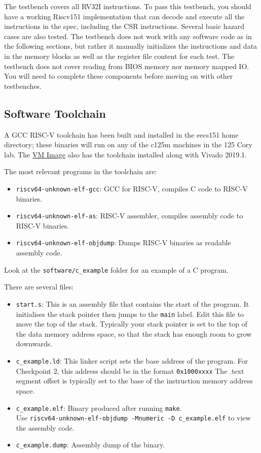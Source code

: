 \documentclass[11pt]{article}
\begin{document}
The testbench covers all RV32I instructions. To pass this testbench, you should have a working Riscv151 implementation that can decode and execute all the instructions in the spec, including the CSR instructions. Several basic hazard cases are also tested. The testbench does not work with any software code as in the following sections, but rather it manually initializes the instructions and data in the memory blocks as well as the register file content for each test. The testbench does not cover reading from BIOS memory nor memory mapped IO. You will need to complete these components before moving on with other testbenches.

\subsection{Software Toolchain}
\label{toolchain}
A GCC RISC-V toolchain has been built and installed in the eecs151 home directory; these binaries will run on any of the c125m machines in the 125 Cory lab. The \href{https://berkeley.box.com/s/s4z0ykpf0tudrm9hce8fsmitpgb2khhe}{VM Image} also has the toolchain installed along with Vivado 2019.1.

The most relevant programs in the toolchain are:
\begin{itemize}
    \item \verb|riscv64-unknown-elf-gcc|: GCC for RISC-V, compiles C code to RISC-V binaries.
    \item \verb|riscv64-unknown-elf-as|: RISC-V assembler, compiles assembly code to RISC-V binaries.
    \item \verb|riscv64-unknown-elf-objdump|: Dumps RISC-V binaries as readable assembly code.
\end{itemize}

Look at the \verb|software/c_example| folder for an example of a C program.

There are several files:
\begin{itemize}
    \item \verb|start.s|: This is an assembly file that contains the start of the program.
      It initialises the stack pointer then jumps to the \verb|main| label.
      Edit this file to move the top of the stack.
      Typically your stack pointer is set to the top of the data memory address space, so that the stack has enough room to grow downwards.

    \item \verb|c_example.ld|: This linker script sets the base address of the program.
      For Checkpoint 2, this address should be in the format \verb|0x1000xxxx|
      The .text segment offset is typically set to the base of the instruction memory address space.

    \item \verb|c_example.elf|: Binary produced after running \verb|make|.\\Use \verb|riscv64-unknown-elf-objdump -Mnumeric -D c_example.elf| to view the assembly code.
    \item \verb|c_example.dump|: Assembly dump of the binary.
\end{itemize}
\end{document}

